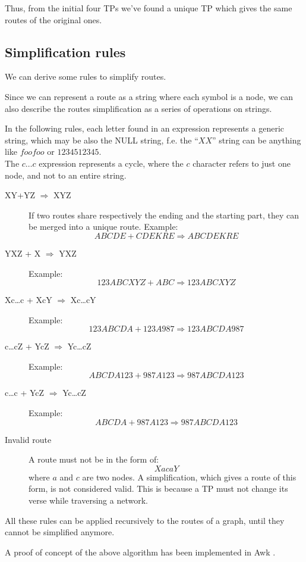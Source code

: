 \documentclass[a4paper]{article}
\begin{document}
Thus, from the initial four TPs we've found a unique TP which gives the same
routes of the original ones.

\subsection{Simplification rules}
\label{sec:simplification_rules}

We can derive some rules to simplify routes.

Since we can represent a route as a string where each symbol is a node, we can
also describe the routes simplification as a series of operations on strings.

In the following rules, each letter found in an expression represents a generic string,
which may be also the NULL string, f.e. the ``$XX$'' string can be anything like
$foofoo$ or $1234512345$.
\\
The $c\dots c$ expression represents a cycle, where the $c$ character refers
to just one node, and not to an entire string.
\begin{description}
	\item[XY+YZ $\Rightarrow$ XYZ]
		If two routes share respectively the ending and the starting
		part, they can be merged into a unique route. Example:
		\[ABCDE + CDEKRE \Rightarrow ABCDEKRE \]
	\item[YXZ + X $\Rightarrow$ YXZ]
		Example:
		\[123ABCXYZ + ABC \Rightarrow 123ABCXYZ\]
	\item[Xc\dots c + XcY $\Rightarrow$ Xc\dots cY]
		Example:
		\[123ABCDA + 123A987 \Rightarrow 123ABCDA987\]
	\item[c\dots cZ + YcZ $\Rightarrow$ Yc\dots cZ]
		Example:
		\[ABCDA123 + 987A123 \Rightarrow 987ABCDA123\]
	\item[c\dots c + YcZ $\Rightarrow$ Yc\dots cZ]
		Example:
		\[ABCDA + 987A123 \Rightarrow 987ABCDA123\]
	\item[Invalid route]
		\label{sec:simroute_invalid}
		A route must not be in the form of:
		\[ XacaY \]
		where $a$ and $c$ are two nodes.
		A simplification, which gives a route of this form, is
		not considered valid. This is because a TP must not change its
		verse while traversing a network.
\end{description}

All these rules can be applied recursively to the routes of a graph, until
they cannot be simplified anymore.

A proof of concept of the above algorithm has been implemented in Awk \cite{simrouteawk}.
\end{document}

